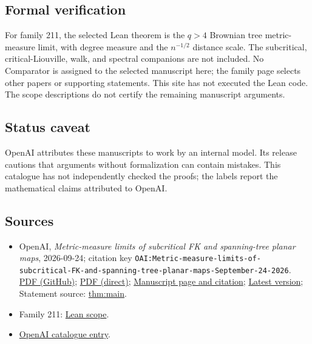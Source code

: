 \documentclass[11pt]{article}
\begin{document}
\subsection{Formal verification}
For family 211, the selected Lean theorem is the $q>4$ Brownian tree metric-measure limit, with degree measure and the $n^{-1/2}$ distance scale. The subcritical, critical-Liouville, walk, and spectral companions are not included. No Comparator is assigned to the selected manuscript here; the family page selects other papers or supporting statements. This site has not executed the Lean code. The scope descriptions do not certify the remaining manuscript arguments.

\subsection{Status caveat}
OpenAI attributes these manuscripts to work by an internal model. Its release cautions that arguments without formalization can contain mistakes. This catalogue has not independently checked the proofs; the labels report the mathematical claims attributed to OpenAI.

\subsection{Sources}
\begin{itemize}
\item OpenAI, \emph{Metric-measure limits of subcritical FK and spanning-tree planar maps}, 2026-09-24; citation key \texttt{OAI:Metric-measure-limits-of-subcritical-FK-and-spanning-tree-planar-maps-September-24-2026}. \href{https://github.com/openai/math/blob/adc7f1241b42e322a6451854ab7e4b4c146bf78a/preprints/Metric-measure-limits-of-subcritical-FK-and-spanning-tree-planar-maps-September-24-2026/main.pdf}{PDF (GitHub)}; \href{https://github.com/openai/math/raw/adc7f1241b42e322a6451854ab7e4b4c146bf78a/preprints/Metric-measure-limits-of-subcritical-FK-and-spanning-tree-planar-maps-September-24-2026/main.pdf}{PDF (direct)}; \href{https://github.com/openai/math/blob/adc7f1241b42e322a6451854ab7e4b4c146bf78a/preprints/Metric-measure-limits-of-subcritical-FK-and-spanning-tree-planar-maps-September-24-2026/README.md}{Manuscript page and citation}; \href{https://github.com/openai/math/blob/main/preprints/Metric-measure-limits-of-subcritical-FK-and-spanning-tree-planar-maps-September-24-2026/main.pdf}{Latest version}; Statement source: \href{https://github.com/openai/math/blob/adc7f1241b42e322a6451854ab7e4b4c146bf78a/preprints/Metric-measure-limits-of-subcritical-FK-and-spanning-tree-planar-maps-September-24-2026/build/sections/01-introduction.tex\#L74}{thm:main}.
\item Family 211: \href{https://github.com/openai/math/blob/adc7f1241b42e322a6451854ab7e4b4c146bf78a/lean/docs/211.md}{Lean scope}.
\item \href{https://github.com/openai/math/blob/adc7f1241b42e322a6451854ab7e4b4c146bf78a/CONTENTS.md}{OpenAI catalogue entry}.
\end{itemize}
\end{document}
